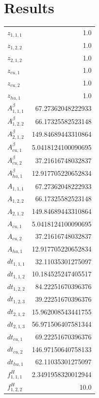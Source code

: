 \documentclass{article}%
\makeatletter
\let\mcnewpage=\newpage%
\newcommand{\TrickSupertabularIntoMulticols}{%
\renewcommand\newpage{%
\if@firstcolumn%
\hrule width\linewidth height0pt%
\columnbreak%
\else%
\mcnewpage%
\fi%
}%
}%
\makeatother
\begin{document}
\section{Results}%
\thispagestyle{plain}%
\begin{multicols*}{3}%
\TrickSupertabularIntoMulticols%
%
\begin{supertabular}{lr}%
	$z_{1,1,1}$ & 1.0 \\%
	$z_{1,2,2}$ & 1.0 \\%
	$z_{2,1,2}$ & 1.0 \\%
	$z_{cu,1}$ & 1.0 \\%
	$z_{cu,2}$ & 1.0 \\%
	$z_{hu,1}$ & 1.0 \\%
	$A_{1,1,1}^{\beta}$ & 67.27362048222933 \\%
	$A_{1,2,2}^{\beta}$ & 66.17325582523148 \\%
	$A_{2,1,2}^{\beta}$ & 149.84689443310864 \\%
	$A_{cu,1}^{\beta}$ & 5.0418124100090695 \\%
	$A_{cu,2}^{\beta}$ & 37.21616748032837 \\%
	$A_{hu,1}^{\beta}$ & 12.917705220652834 \\%
	$A_{1,1,1}$ & 67.27362048222933 \\%
	$A_{1,2,2}$ & 66.17325582523148 \\%
	$A_{2,1,2}$ & 149.84689443310864 \\%
	$A_{cu,1}$ & 5.0418124100090695 \\%
	$A_{cu,2}$ & 37.21616748032837 \\%
	$A_{hu,1}$ & 12.917705220652834 \\%
	$dt_{1,1,1}$ & 32.11035301275097 \\%
	$dt_{1,1,2}$ & 10.184525247405517 \\%
	$dt_{1,2,2}$ & 84.22251670396376 \\%
	$dt_{1,2,3}$ & 39.22251670396376 \\%
	$dt_{2,1,2}$ & 15.962008543441755 \\%
	$dt_{2,1,3}$ & 56.971506407581344 \\%
	$dt_{cu,1}$ & 69.22251670396376 \\%
	$dt_{cu,2}$ & 146.97150640758133 \\%
	$dt_{hu,1}$ & 62.11035301275097 \\%
	$f_{1,1,1}^{H}$ & 2.3491958320012944 \\%
	$f_{1,2,2}^{H}$ & 10.0 \\%

\end{supertabular}
\end{multicols*}
\end{document}
